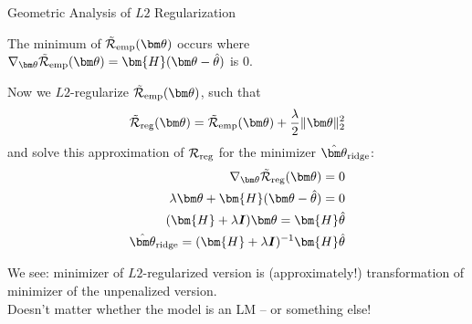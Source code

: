 \documentclass[11pt,compress,t,notes=noshow, xcolor=table]{beamer}
\begin{document}
\begin{vbframe}{Geometric Analysis of $L2$ Regularization}

\normalsize

The minimum of $\mathcal{\tilde R}_{\text{emp}}(\thetav)$ occurs where $\nabla_{\thetav}\mathcal{\tilde R}_{\text{emp}}(\thetav) = \bm{H}(\thetav - \thetah)$ is $0$.

Now we $L2$-regularize $\mathcal{\tilde R}_{\text{emp}}(\thetav)$, such that 
\[
\mathcal{\tilde R}_{\text{reg}}(\thetav) = \mathcal{\tilde R}_{\text{emp}}(\thetav) + \frac{\lambda}{2} \|\thetav\|^2_2\]
and solve this approximation of $\mathcal{R}_{\text{reg}}$ for the minimizer $\hat{\thetav}_{\text{ridge}}$:
\begin{align*}
 \nabla_{\thetav}\mathcal{\tilde R}_{\text{reg}}(\thetav) = 0\\
  \lambda \thetav + \bm{H}(\thetav - \thetah) = 0\\
      (\bm{H} + \lambda \id) \thetav = \bm{H} \thetah\\
      \hat{\thetav}_{\text{ridge}} = (\bm{H} + \lambda \id)^{-1}\bm{H} \thetah
\end{align*}

We see: minimizer of $L2$-regularized version is (approximately!) transformation of minimizer of the unpenalized version.\\
Doesn't matter whether the model is an LM -- or something else!
\vspace{0.2cm}



\end{vbframe}
\end{document}
